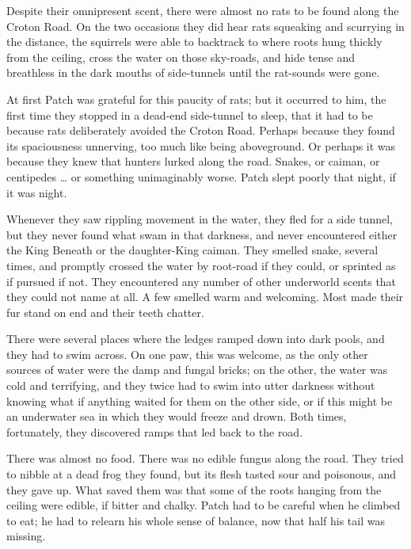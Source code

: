 \documentclass[ebook,oneside,openany,17pt]{memoir}
\newenvironment{tolerant}[1]{%
  \par\tolerance=#1\relax
}{%
  \par
}
\begin{document}
Despite their omnipresent scent, there were almost no rats to be found
along the Croton Road. On the two occasions they did hear rats
squeaking and scurrying in the distance, the squirrels were able to
backtrack to where roots hung thickly from the ceiling, cross the
water on those sky-roads, and hide tense and breathless in the dark
mouths of side-tunnels until the rat-sounds were gone.

\begin{tolerant}{1000}
At first Patch was grateful for this paucity of rats; but it occurred
to him, the first time they stopped in a dead-end side-tunnel to
sleep, that it had to be because rats deliberately avoided the Croton
Road. Perhaps because they found its spaciousness unnerving, too much
like being aboveground. Or perhaps it was because they knew that
hunters lurked along the road. Snakes, or caiman, or centipedes … or
something unimaginably worse. Patch slept poorly that night, if it was
night.
\end{tolerant}

\begin{tolerant}{1000}
Whenever they saw rippling movement in the water, they fled for a side
tunnel, but they never found what swam in that darkness, and never
encountered either the King Beneath or the daughter-King caiman. They
smelled snake, several times, and promptly crossed the water by
root-road if they could, or sprinted as if pursued if not. They
encountered any number of other underworld scents that they could not
name at all. A few smelled warm and welcoming. Most made their fur
stand on end and their teeth chatter.
\end{tolerant}

\begin{tolerant}{1000}
There were several places where the ledges ramp\-ed down into dark
pools, and they had to swim across. On one paw, this was welcome, as
the only other sources of water were the damp and fungal bricks; on
the other, the water was cold and terrifying, and they twice had to
swim into utter darkness without knowing what if anything waited for
them on the other side, or if this might be an underwater sea in which
they would freeze and drown. Both times, fortunately, they discovered
ramps that led back to the road.
\end{tolerant}

There was almost no food. There was no edible fungus along the
road. They tried to nibble at a dead frog they found, but its flesh
tasted sour and poisonous, and they gave up. What saved them was that
some of the roots hanging from the ceiling were edible, if bitter and
chalky. Patch had to be careful when he climbed to eat; he had to
relearn his whole sense of balance, now that half his tail was
missing.
\end{document}
